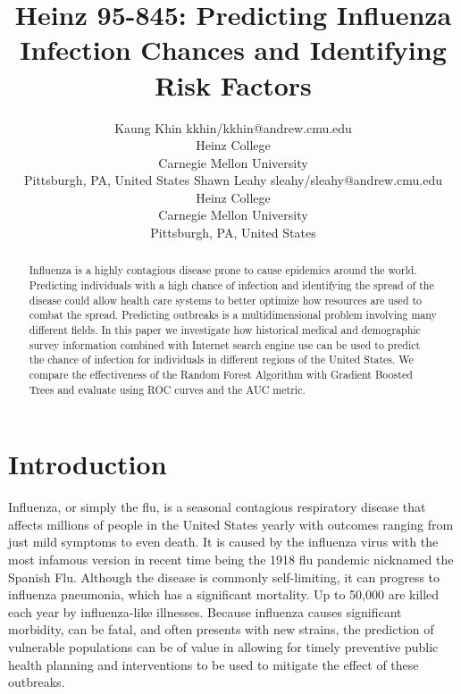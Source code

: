 \documentclass[twoside,11pt]{article}
\begin{document}
\title{Heinz 95-845: Predicting Influenza Infection Chances and Identifying Risk Factors}

\author{\name Kaung Khin \email kkhin/kkhin@andrew.cmu.edu \\
       \addr Heinz College\\
       Carnegie Mellon University\\
       Pittsburgh, PA, United States
       \AND
       \name Shawn Leahy \email sleahy/sleahy@andrew.cmu.edu \\
       \addr Heinz College\\
       Carnegie Mellon University\\
       Pittsburgh, PA, United States}

\maketitle

\begin{abstract}
Influenza is a highly contagious disease prone to cause epidemics around the world.  Predicting individuals with a high chance of infection and identifying the spread of the disease could allow health care systems to better optimize how resources are used to combat the spread.  Predicting outbreaks is a multidimensional problem involving many different fields.  In this paper we investigate how historical medical and demographic survey information combined with Internet search engine use can be used to predict the chance of infection for individuals in different regions of the United States.  We compare the effectiveness of the Random Forest Algorithm with Gradient Boosted Trees and evaluate using ROC curves and the AUC metric.    
\end{abstract}

\section{Introduction}
Influenza, or simply the flu, is a seasonal contagious respiratory disease that
affects millions of people in the United States yearly with outcomes ranging
from just mild symptoms to even death. \citep{cdc} It is caused by the influenza virus with the most infamous version in recent time being the 1918 flu pandemic nicknamed the Spanish Flu. \citep{rolfes_etal_2017} Although the disease is commonly self-limiting, it can progress to influenza pneumonia, which has a significant mortality. Up to 50,000 are killed each year by influenza-like illnesses.  Because influenza causes significant morbidity, can be fatal, and often presents with new strains, the prediction of vulnerable populations can be of value in allowing for timely preventive public health planning and interventions to be used to mitigate the effect of these outbreaks.     
\end{document}

